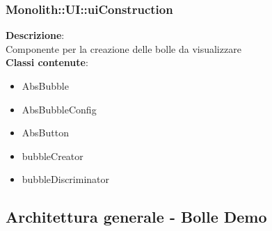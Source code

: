 \subsubsection{Monolith::UI::uiConstruction}
   \FloatBarrier
\FloatBarrier
\textbf{Descrizione}:\\
 Componente per la creazione delle bolle da visualizzare 
\\ \textbf{Classi contenute}:\\
\begin{itemize}
\item AbsBubble
\item AbsBubbleConfig
\item AbsButton
\item bubbleCreator
\item bubbleDiscriminator
\end{itemize}


\clearpage \subsection{Architettura generale - Bolle Demo}
